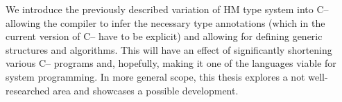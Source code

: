 \documentclass[12pt,a4paper]{report}
\begin{document}
We introduce the previously described variation of HM type system into C-- allowing the compiler to infer the necessary type annotations (which in the current version of C-- have to be explicit) and allowing for defining generic structures and algorithms. This will have an effect of significantly shortening various C-- programs and, hopefully, making it one of the languages viable for system programming. In more general scope, this thesis explores a not well-researched area and showcases a possible development.
\end{document}
